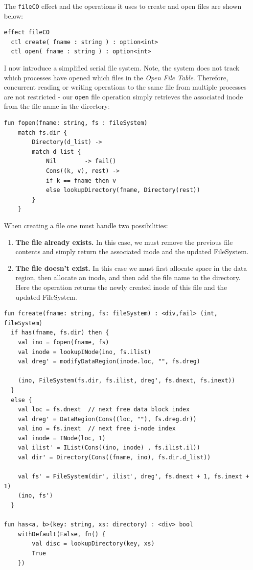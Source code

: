 \documentclass[logo,bsc,singlespacing,parskip]{infthesis}
\begin{document}
The \lstinline{fileCO} effect and the operations it uses to create and open files are shown below:

\begin{lstlisting}
effect fileCO
  ctl create( fname : string ) : option<int>
  ctl open( fname : string ) : option<int>
\end{lstlisting}
I now introduce a simplified serial file system. Note, the system does not track which processes have opened which files in the \textit{Open File Table}. Therefore, concurrent reading or writing operations to the same file from multiple processes are not restricted - our \lstinline{open} file operation simply retrieves the associated inode from the file name in the directory:




\begin{lstlisting}
fun fopen(fname: string, fs : fileSystem) 
    match fs.dir {
        Directory(d_list) ->
        match d_list {
            Nil        -> fail()  
            Cons((k, v), rest) ->
            if k == fname then v
            else lookupDirectory(fname, Directory(rest))
        }
    }
\end{lstlisting}    


When creating a file one must handle two possibilities:
\begin{enumerate}
    \item \textbf{The file already exists.} In this case, we must remove the previous file contents and simply return the associated  inode and the updated FileSystem.
    \item \textbf{The file doesn't exist.} In this case we must first allocate space in the data region, then allocate an inode, and then add the file name to the directory. Here the operation returns the newly created inode of this file and the updated FileSystem.
\end{enumerate}

\begin{lstlisting}
fun fcreate(fname: string, fs: fileSystem) : <div,fail> (int, fileSystem) 
  if has(fname, fs.dir) then {
    val ino = fopen(fname, fs)  
    val inode = lookupINode(ino, fs.ilist)  
    val dreg' = modifyDataRegion(inode.loc, "", fs.dreg)  

    (ino, FileSystem(fs.dir, fs.ilist, dreg', fs.dnext, fs.inext))  
  }
  else {
    val loc = fs.dnext  // next free data block index
    val dreg' = DataRegion(Cons((loc, ""), fs.dreg.dr))  
    val ino = fs.inext  // next free i-node index
    val inode = INode(loc, 1)  
    val ilist' = IList(Cons((ino, inode) , fs.ilist.il))  
    val dir' = Directory(Cons((fname, ino), fs.dir.d_list))
    
    val fs' = FileSystem(dir', ilist', dreg', fs.dnext + 1, fs.inext + 1)  
    (ino, fs')
  }

fun has<a, b>(key: string, xs: directory) : <div> bool
    withDefault(False, fn() {
        val disc = lookupDirectory(key, xs)  
        True  
    })
\end{lstlisting}
\end{document}
